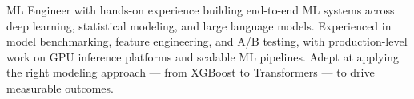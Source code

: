 
ML Engineer with hands-on experience building end-to-end ML systems across deep learning, statistical modeling, and large language models. Experienced in model benchmarking, feature engineering, and A/B testing, with production-level work on GPU inference platforms and scalable ML pipelines. Adept at applying the right modeling approach — from XGBoost to Transformers — to drive measurable outcomes.

